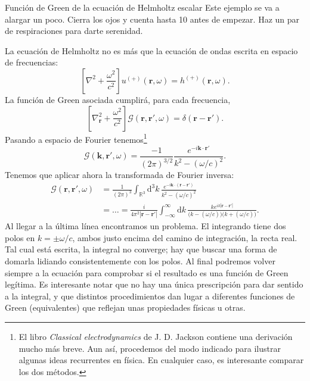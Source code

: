 \begin{example}
    {Función de Green de la ecuación de Helmholtz escalar
    \label{ej.1-helmholtz_green}}
    Este ejemplo se va a alargar un poco. Cierra los ojos y cuenta hasta 10 antes de empezar. Haz un par de respiraciones para darte serenidad. 

    La ecuación de Helmholtz no es más que la ecuación de ondas escrita en espacio de frecuencias:
    \begin{equation}
        \left[\nabla^2 + \frac{\omega^2}{c^2}\right] u^{(+)}(\mathbf{r}, \omega) = h^{(+)}(\mathbf{r}, \omega).
    \end{equation}
    La función de Green asociada cumplirá, para cada frecuencia,
    \begin{equation}
        \label{eq.1-green_helmholtz_escalar}
        \left[\nabla^2_\mathbf{r} + \frac{\omega^2}{c^2}\right]\mathcal{G}(\mathbf{r},\mathbf{r}',\omega) = \delta(\mathbf{r}-\mathbf{r}').
    \end{equation}
    Pasando a espacio de Fourier tenemos\footnote{El libro \textit{Classical electrodynamics} de J. D. Jackson contiene una derivación mucho más breve. Aun así, procedemos del modo indicado para ilustrar algunas ideas recurrentes en física. En cualquier caso, es interesante comparar los dos métodos.}
    \begin{equation}
        \mathcal{G}(\mathbf{k}, \mathbf{r}',\omega) = \frac{-1}{(2\pi)^{3/2}} \frac{e^{-i\mathbf{k}\cdot\mathbf{r}'}}{k^2-(\omega/c)^2}.
    \end{equation}
    Tenemos que aplicar ahora la transformada de Fourier inversa: 
    \begin{align}
        \nonumber
        \mathcal{G}(\mathbf{r},\mathbf{r}',\omega) &= \frac{1}{(2\pi)^3}\int_{\mathbb{R}^3}\mathrm{d}^3k\, \frac{e^{-i\mathbf{k}\cdot(\mathbf{r}-\mathbf{r}')}}{k^2-(\omega/c)^2} \\
        \label{eq.1-helmholtz_fourier_green}
        &= \dots = \frac{i}{4\pi^2|\mathbf{r}-\mathbf{r}'|} \int_{-\infty}^{\infty}\mathrm{d}k\, \frac{k e^{ik|\mathbf{r}-\mathbf{r}'|}}{\big(k-(\omega/c)\big)\big(k+(\omega/c)\big)}.
    \end{align}
    Al llegar a la última línea encontramos un problema. El integrando tiene dos polos en \(k=\pm \omega/c\), ambos justo encima del camino de integración, la recta real. Tal cual está escrita, la integral no converge; hay que buscar una forma de domarla lidiando consistentemente con los polos. Al final podremos volver siempre a la ecuación para comprobar si el resultado es una función de Green legítima. Es interesante notar que no hay una única prescripción para dar sentido a la integral, y que distintos procedimientos dan lugar a diferentes funciones de Green (equivalentes) que reflejan unas propiedades físicas u otras.


\end{example}

